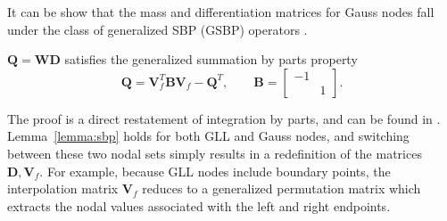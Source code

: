 \documentclass[review,onefignum,onetabnum,final]{siamart171218}
\newcommand{\pd}[2]{\frac{\partial#1}{\partial#2}}
\newcommand{\LRp}[1]{\left( #1 \right)}
\newcommand{\LRl}[1]{\left. #1 \right|}
\newcommand{\note}[1]{{\color{blue}{#1}}}
\begin{document}
It can be show that the mass and differentiation matrices for Gauss nodes fall under the class of generalized SBP (GSBP) operators \cite{fernandez2014generalized}.  
\begin{lemma}
\label{lemma:sbp}
$\bm{Q} = \bm{W}\bm{D}$ satisfies the generalized summation by parts property
\[
\bm{Q} = \bm{V}_f^T \bm{B} \bm{V}_f - \bm{Q}^T, \qquad \bm{B} = \begin{bmatrix}-1 & \\ & 1\end{bmatrix}.
\]
\end{lemma}
The proof is a direct restatement of integration by parts, and can be found in \cite{fernandez2014generalized, ortleb2016kinetic, ortleb2017kinetic, ranocha2018generalised}.  
Lemma~\ref{lemma:sbp} holds for both GLL and Gauss nodes, and switching between these two nodal sets simply results in a redefinition of the matrices $\bm{D}, \bm{V}_f$.  For example, because GLL nodes include boundary points, the interpolation matrix $\bm{V}_f$ reduces to a generalized permutation matrix which extracts the nodal values associated with the left and right endpoints.  %
\end{document}
